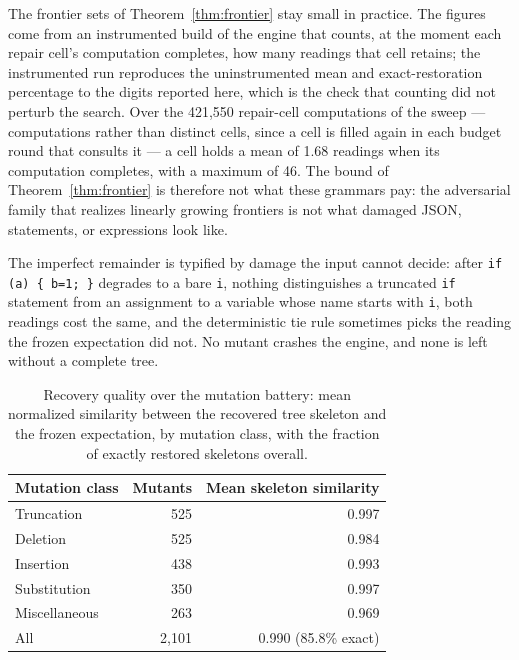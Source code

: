 \documentclass[manuscript]{acmart}
\newcommand{\cd}[1]{\texttt{#1}}
\begin{document}
The frontier sets of Theorem~\ref{thm:frontier} stay small in practice. The figures come from an instrumented build of the engine that counts, at the moment each repair cell's computation completes, how many readings that cell retains; the instrumented run reproduces the uninstrumented mean and exact-restoration percentage to the digits reported here, which is the check that counting did not perturb the search. Over the 421{,}550 repair-cell computations of the sweep --- computations rather than distinct cells, since a cell is filled again in each budget round that consults it --- a cell holds a mean of 1.68 readings when its computation completes, with a maximum of 46. The bound of Theorem~\ref{thm:frontier} is therefore not what these grammars pay: the adversarial family that realizes linearly growing frontiers is not what damaged JSON, statements, or expressions look like.

The imperfect remainder is typified by damage the input cannot decide: after \cd{if (a) \{ b=1; \}} degrades to a bare \cd{i}, nothing distinguishes a truncated \cd{if} statement from an assignment to a variable whose name starts with \cd{i}, both readings cost the same, and the deterministic tie rule sometimes picks the reading the frozen expectation did not. No mutant crashes the engine, and none is left without a complete tree.

\begin{table}[tbp]
\centering
{\small
\begin{tabular}{lrr}\toprule
Mutation class & Mutants & Mean skeleton similarity \\\midrule
Truncation      &   525 & 0.997 \\
Deletion        &   525 & 0.984 \\
Insertion       &   438 & 0.993 \\
Substitution    &   350 & 0.997 \\
Miscellaneous   &   263 & 0.969 \\\midrule
All             & 2{,}101 & 0.990 \qquad (85.8\% exact) \\\bottomrule
\end{tabular}
}
\caption{\label{tab:battery}Recovery quality over the mutation battery: mean normalized similarity between the recovered tree skeleton and the frozen expectation, by mutation class, with the fraction of exactly restored skeletons overall.}
\end{table}

\end{document}

